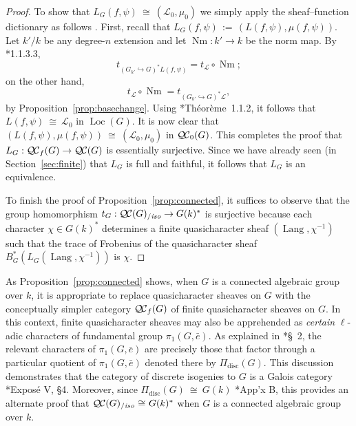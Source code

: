 \documentclass[11pt]{amsart}
\theoremstyle{plain}
\theoremstyle{definition}
\theoremstyle{remark}
\newcommand{\bFq}{\bar{k}}
\newcommand{\Fq}{k}
\DeclareMathOperator{\Gal}{Gal}
\DeclareMathOperator{\Nm}{Nm}
\newcommand{\ceq}{{\, :=\, }}
\newcommand{\iso}{{\ \cong\ }}
\newcommand{\qcs}[1]{{\mathcal{#1}}}
\newcommand{\QC}{{\mathcal{Q\hskip-0.8pt C}}}
\newcommand{\QCb}{{\QC_0}}
\newcommand{\QCf}{{\QC_f}}
\newcommand{\QCiso}[1]{\QC(#1)_{/\textit{iso}}}
\newcommand{\Lang}{{\operatorname{Lang}}}
\newcommand{\Loc}{{\operatorname{Loc}}}
\newcommand{\trFrob}[1]{t_{#1}}
\newcommand\David[1]{\marginpar{\smaller\smaller DR: #1}}
\begin{document}
\begin{proof}
  To show that $L_G(f,\psi) \iso (\qcs{L}_0,\mu_0)$ we simply apply the sheaf--function dictionary
  as follows .
  First, recall that $L_G(f,\psi) \ceq (L(f,\psi), \mu(f,\psi))$.
  Let $k'/k$ be any degree-$n$ extension and let $\Nm : k'\to k$ be the norm map. 
  By \cite{laumon:87a}*{1.1.3.3}, 
  \[
  \trFrob{(G_{k'}\hookrightarrow G)^*L(f,\psi)} = \trFrob{\qcs{L}} \circ \Nm;
  \]
  on the other hand, 
  \[
  \trFrob{\qcs{L}} \circ \Nm = \trFrob{(G_{k'}\hookrightarrow G)^*\qcs{L}},
  \]
   by Proposition~\ref{prop:basechange}.
  Using \cite{laumon:87a}*{Th\'eor\`eme~1.1.2}, it follows that  $L(f,\psi) \iso \qcs{L}_0$ in $\Loc(G)$.
  It is now clear that $(L(f,\psi),\mu(f,\psi)) \iso (\qcs{L}_0,\mu_0)$ in $\QCb(G)$.
  This completes the proof that $L_G : \QCf(G) \to \QC(G)$ is essentially surjective.
  Since we have already seen (in Section~\ref{sec:finite}) that $L_G$ is full and faithful, 
  it follows that $L_G$ is an equivalence.
  
  To finish the proof of Proposition~\ref{prop:connected}, it suffices to observe that the group homomorphism
  $
  \trFrob{G} : \QCiso{G} \to G(\Fq)^*
  $
  is surjective because each character $\chi \in G(\Fq)^*$ determines a finite quasicharacter
  sheaf $(\Lang,\chi^{-1})$ such that the trace of Frobenius of the quasicharacter sheaf
  $B_G^* (L_G(\Lang,\chi^{-1}))$ is $\chi$.
\end{proof}

As Proposition~\ref{prop:connected} shows, 
when $G$ is a connected algebraic group over $\Fq$, 
it is appropriate to replace quasicharacter sheaves on $G$ 
with the conceptually simpler category $\QCf(G)$ of finite quasicharacter sheaves on $G$. 
In this context, finite quasicharacter sheaves may also be apprehended as
\emph{certain} $\ell$-adic characters of fundamental group $\pi_1(G,{\bar e})$. 
As explained in \cite{kamgarpour:09a}*{\S~2}, 
the relevant characters of $\pi_1(G,{\bar e})$ are precisely those 
that factor through a particular quotient of $\pi_1(G,{\bar e})$ 
denoted there by $\Pi_\text{disc}(G)$.
This discussion demonstrates that the category of discrete isogenies to $G$ is a Galois category
\cite{grothendieck:SGA1}*{Expos\'e V, \S 4}. Moreover, since $\Pi_\text{disc}(G) \iso G(\Fq)$
\cite{kamgarpour:09a}*{App'x B}, this \David{What does ``this'' refer to} provides an alternate proof that
$\QCiso{G} \iso G(\Fq)^*$ when $G$ is a connected algebraic group over $\Fq$.
\end{document}
